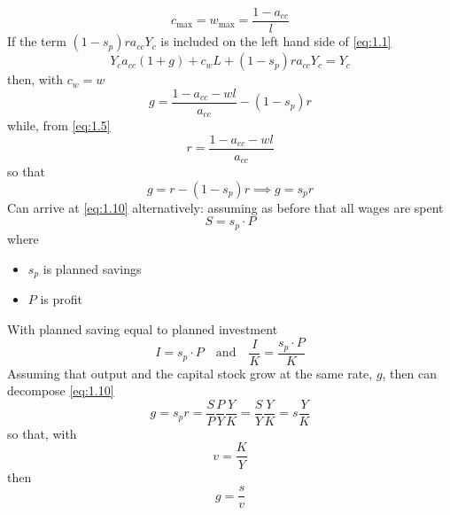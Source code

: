 \documentclass{article}
\begin{document}
	\begin{equation}
		c_{\max} = w_{\max} = \frac{1-a_{cc}}{l} \label{eq:1.9}
	\end{equation}
	If the term \( (1-s_p)ra_{cc}Y_c \) is included on the left hand side of \cref{eq:1.1}
	\[
		Y_c a_{cc} (1+g) + c_w L + (1-s_p)ra_{cc}Y_c = Y_c
	\]
	then, with \( c_w = w \)
	\[
		g = \frac{1-a_{cc}-wl}{a_{cc}}-(1-s_p)r
	\]
	while, from \cref{eq:1.5}
	\[
		r = \frac{1-a_{cc}-wl}{a_{cc}}
	\]
	so that
	\begin{equation}
		g = r-(1-s_p)r \implies g = s_p r \label{eq:1.10}
	\end{equation}
	Can arrive at \cref{eq:1.10} alternatively: assuming as before that all wages are spent
	\begin{equation}
		S = s_p \cdot P \label{eq:1.11}
	\end{equation}
	where
	\begin{itemize}
		\item \( s_p \) is planned savings
		\item \( P \) is profit
	\end{itemize}
	With planned saving equal to planned investment
	\begin{equation}
		I = s_p \cdot P \quad\text{and}\quad \frac{I}{K} = \frac{s_p \cdot P}{K} \label{eq:1.12}
	\end{equation}
	Assuming that output and the capital stock grow at the same rate, \( g \), then can decompose \cref{eq:1.10}
	\begin{equation}
		g = s_p r = \frac{S}{P}\frac{P}{Y}\frac{Y}{K} = \frac{S}{Y}\frac{Y}{K} = s \frac{Y}{K} \label{eq:1.13}
	\end{equation}
	so that, with
	\begin{equation}
		v = \frac{K}{Y} \label{eq:1.14}
	\end{equation}
	then
	\begin{equation}
		g = \frac{s}{v}
	\end{equation}
\end{document}
